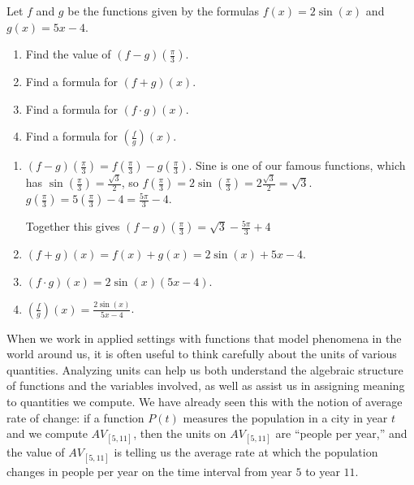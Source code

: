 \documentclass{ximera}
\begin{document}
	\begin{example}
		Let $f$ and $g$ be the functions given by the formulas $f(x) = 2\sin(x)$ and $g(x)=5x-4$.
		\begin{enumerate}
			\item Find the value of $( f - g)\left( \frac{\pi}{3} \right)$.\\
			\item Find a formula for $( f + g)(x)$.\\
			\item Find a formula for $( f \cdot g)(x)$.\\
			\item Find a formula for $\left( \frac{f}{g}\right)(x)$.\\
		\end{enumerate}
		\begin{explanation}
			\begin{enumerate}
				\item $(f-g)\left( \frac{\pi}{3} \right) = f\left( \frac{\pi}{3} \right)-g\left( \frac{\pi}{3} \right)$.
					Sine is one of our famous functions, which has $\sin\left( \frac{\pi}{3} \right) = \frac{\sqrt{3}}{2}$, so 
					$f\left( \frac{\pi}{3} \right) = 2 \sin\left( \frac{\pi}{3} \right) = 2 \frac{\sqrt{3}}{2} = \sqrt{3}$.
					$g\left( \frac{\pi}{3} \right) = 5\left( \frac{\pi}{3} \right)-4 = \frac{5\pi}{3}-4$.
					
					Together this gives $(f-g)\left( \frac{\pi}{3} \right) = \sqrt{3} - \frac{5\pi}{3}+4$
				
				\item $( f + g)(x) = f(x) + g(x) = 2\sin(x) + 5x - 4$.\\
					
				\item $( f \cdot g)(x) = 2\sin(x)\left(5x-4\right)$.\\

				\item $\left( \frac{f}{g}\right)(x) = \frac{2\sin(x)}{5x-4}$.\\
			\end{enumerate}
		\end{explanation}
	\end{example}
	
	

	
	When we work in applied settings with functions that model phenomena in the world around us, it is often useful to think carefully about the units of 
	various quantities. Analyzing units can help us both understand the algebraic structure of functions and the variables involved, as well as assist us in 
	assigning meaning to quantities we compute. We have already seen this with the notion of average rate of change: if a function $P(t)$ measures the 
	population in a city in year $t$ and we compute $AV_{[5, 11]}$, then the units on $AV_{[5, 11]}$ are ``people per year,'' and the value of 
	$AV_{[5, 11]}$ is telling us the average rate at which the population changes in people per year on the time interval from year $5$ to year $11$.
\end{document}
